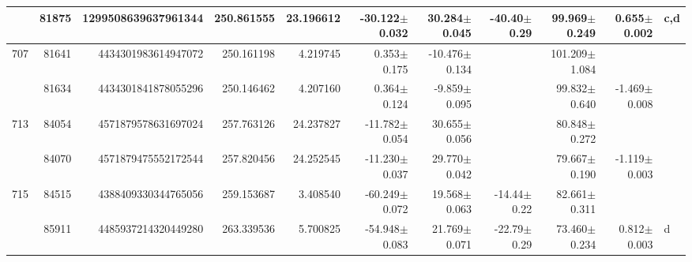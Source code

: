 \documentclass{ws-ijmpd}
\begin{document}
\begin{landscape}
\begin{longtable}{rrrrrrrrrrl}
            &   81875 &      1299508639637961344 &                   250.861555 &                    23.196612 &                -30.122$\pm$0.032 &                 30.284$\pm$0.045 &         -40.40$\pm$  0.29 &        99.969$\pm$0.249 &                           0.655$\pm$0.002 &                                                c,d \\
 \hline 707 &   81641 &      4434301983614947072 &                   250.161198 &                     4.219745 &                  0.353$\pm$0.175 &                -10.476$\pm$0.134 &                           &       101.209$\pm$1.084 &                                           &                                                    \\
            &   81634 &      4434301841878055296 &                   250.146462 &                     4.207160 &                  0.364$\pm$0.124 &                 -9.859$\pm$0.095 &                           &        99.832$\pm$0.640 &                          -1.469$\pm$0.008 &                                                    \\
 \hline 713 &   84054 &      4571879578631697024 &                   257.763126 &                    24.237827 &                -11.782$\pm$0.054 &                 30.655$\pm$0.056 &                           &        80.848$\pm$0.272 &                                           &                                                    \\
            &   84070 &      4571879475552172544 &                   257.820456 &                    24.252545 &                -11.230$\pm$0.037 &                 29.770$\pm$0.042 &                           &        79.667$\pm$0.190 &                          -1.119$\pm$0.003 &                                                    \\
 \hline 715 &   84515 &      4388409330344765056 &                   259.153687 &                     3.408540 &                -60.249$\pm$0.072 &                 19.568$\pm$0.063 &         -14.44$\pm$  0.22 &        82.661$\pm$0.311 &                                           &                                                    \\
            &   85911 &      4485937214320449280 &                   263.339536 &                     5.700825 &                -54.948$\pm$0.083 &                 21.769$\pm$0.071 &         -22.79$\pm$  0.29 &        73.460$\pm$0.234 &                           0.812$\pm$0.003 &                                                  d \\

\end{longtable}
\end{landscape}
\end{document}
